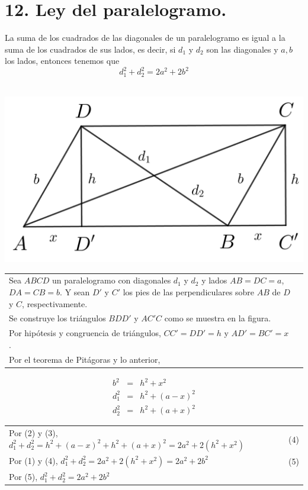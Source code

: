 \documentclass[12pt,a4paper, oneside]{book}
\begin{document}
\section{12. Ley del paralelogramo.}
La suma de los cuadrados de las diagonales de un paralelogramo es igual a la suma de los cuadrados de sus lados, es decir, si $d_1$ y $d_2$ son las diagonales y $a, b$ los lados, entonces tenemos que 
$$d_1^2 + d_2^2=2a^2+2b^2$$
\\
\begin{center}
\includegraphics[scale=0.7]{Imagenes/paralelogramo.png} 
\end{center}
\begin{tabular}{p{15.9 cm} p{1cm}}
Sea $ABCD$ un paralelogramo con diagonales $d_1$ y $d_2$ y lados $AB=DC=a$, $DA=CB=b$. Y sean $D'$ y $C'$ los pies de las perpendiculares sobre $AB$ de $D$ y $C$, respectivamente.
\\Se construye los triángulos $BDD'$ y $AC'C$ como se muestra en la figura.
\\Por hipótesis y congruencia de triángulos, $CC'=DD'=h$ y $AD'=BC'=x$.
\\Por el teorema de Pitágoras y lo anterior, 
\end{tabular}
\begin{eqnarray}
b^2&=& h^2 +x^2 \\
d_1^2 &=&h^2 +(a-x)^2\\
d_2^2&=&h^2 +(a+x)^2
\end{eqnarray}
\begin{tabular}{p{15.9 cm} p{1cm}}
Por (2) y (3), $d_1^2 +d_2^2=h^2 +(a-x)^2+h^2 +(a+x)^2=2a^2+2(h^2+x^2)$ &(4)
\\Por (1) y (4), $d_1^2 +d_2^2=2a^2+2(h^2+x^2)=2a^2+2b^2$ & (5)
\\Por (5), $d_1^2 +d_2^2=2a^2+2b^2$
\end{tabular}
\end{document}
